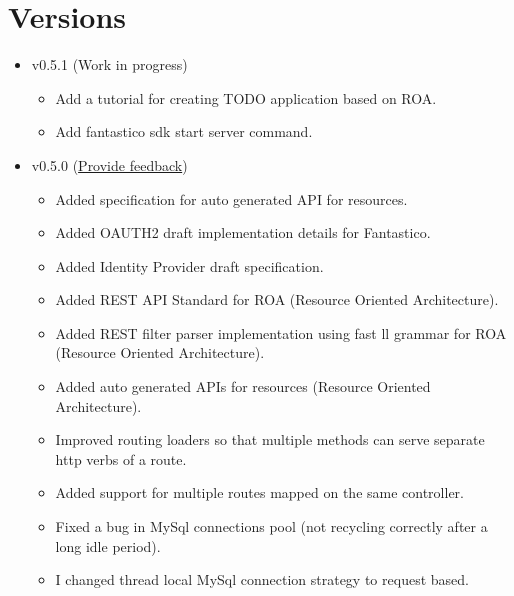 \documentclass[letterpaper,10pt,english]{sphinxmanual}
\begin{document}
\section{Versions}
\label{changes:versions}\begin{itemize}
\item {} 
v0.5.1 (Work in progress)
\begin{itemize}
\item {} 
Add a tutorial for creating TODO application based on ROA.

\item {} 
Add fantastico sdk start server command.

\end{itemize}

\item {} 
v0.5.0 (\href{https://docs.google.com/forms/d/1tKBopU3lfDB\_w8F4h7Rl1Rn4uydAJq-nha09L\_ptJck/edit?usp=sharing}{Provide feedback})
\begin{itemize}
\item {} 
Added specification for auto generated API for resources.

\item {} 
Added OAUTH2 draft implementation details for Fantastico.

\item {} 
Added Identity Provider draft specification.

\item {} 
Added REST API Standard for ROA (Resource Oriented Architecture).

\item {} 
Added REST filter parser implementation using fast ll grammar for ROA (Resource Oriented Architecture).

\item {} 
Added auto generated APIs for resources (Resource Oriented Architecture).

\item {} 
Improved routing loaders so that multiple methods can serve separate http verbs of a route.

\item {} 
Added support for multiple routes mapped on the same controller.

\item {} 
Fixed a bug in MySql connections pool (not recycling correctly after a long idle period).

\item {} 
I changed thread local MySql connection strategy to request based.


\end{itemize}
\end{itemize}
\end{document}
